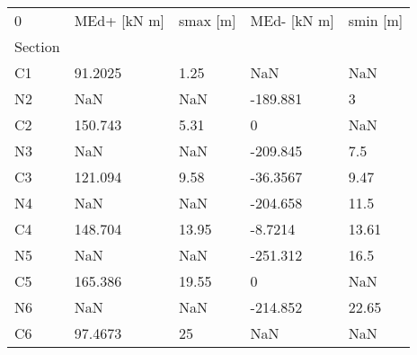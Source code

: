 \begin{tabular}{lllll}
\toprule
0 & MEd+ [kN m] & smax [m] & MEd- [kN m] & smin [m] \\
Section &             &          &             &          \\
\midrule
C1      &     91.2025 &     1.25 &         NaN &      NaN \\
N2      &         NaN &      NaN &    -189.881 &        3 \\
C2      &     150.743 &     5.31 &           0 &      NaN \\
N3      &         NaN &      NaN &    -209.845 &      7.5 \\
C3      &     121.094 &     9.58 &    -36.3567 &     9.47 \\
N4      &         NaN &      NaN &    -204.658 &     11.5 \\
C4      &     148.704 &    13.95 &     -8.7214 &    13.61 \\
N5      &         NaN &      NaN &    -251.312 &     16.5 \\
C5      &     165.386 &    19.55 &           0 &      NaN \\
N6      &         NaN &      NaN &    -214.852 &    22.65 \\
C6      &     97.4673 &       25 &         NaN &      NaN \\
\bottomrule
\end{tabular}

